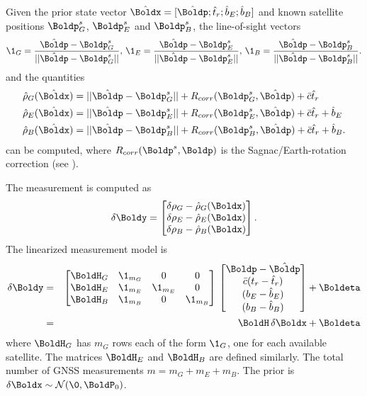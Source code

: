Given the prior state vector 
$\hat{\Boldx} = [\hat{\Boldp};\hat{t}_r;\hat{b}_{E};\hat{b}_{B}]$
and known satellite positions $\Boldp^s_G$, $\Boldp^s_E$ and $\Boldp^s_B$, the line-of-sight vectors 
\begin{equation}\label{eqn:ones}
\1_G = \frac{\hat{\Boldp}-\Boldp^s_G}{||\hat{\Boldp}-\Boldp^s_G||},\,
\1_E = \frac{\hat{\Boldp}-\Boldp^s_E}{||\hat{\Boldp}-\Boldp^s_E||},\,
\1_B = \frac{\hat{\Boldp}-\Boldp^s_B}{||\hat{\Boldp}-\Boldp^s_B||}.
\end{equation}
and the quantities
\begin{equation}\nonumber
	\begin{aligned}
		\hat{\rho}_G(\hat{\Boldx}) &= ||\hat{\Boldp}-\Boldp^s_G|| + R_{corr}(\Boldp^s_G,\hat{\Boldp})+ \bar{c}\hat{t}_r\\
		\hat{\rho}_E(\hat{\Boldx}) &= ||\hat{\Boldp}-\Boldp^s_E|| + R_{corr}(\Boldp^s_E,\hat{\Boldp})+ \bar{c} \hat{t}_r+\hat{b}_{E}\\
		\hat{\rho}_B(\hat{\Boldx}) &= ||\hat{\Boldp}-\Boldp^s_B|| + R_{corr}(\Boldp^s_B,\hat{\Boldp})+ \bar{c} \hat{t}_r+\hat{b}_{B}.
	\end{aligned}
\end{equation}
can be computed, where $R_{corr}(\Boldp^s,\Boldp)$ is the Sagnac/Earth-rotation correction (see \cite{HuFarrell2019}).

The measurement is computed as
$$\delta \Boldy =\begin{bmatrix}
\delta\rho_{G}-\hat{\rho}_G(\Boldx)\\
\delta\rho_{E}- \hat{\rho}_E(\Boldx)\\
\delta\rho_{B}-\hat{\rho}_B(\Boldx) \end{bmatrix}.$$
The linearized measurement model is
\begin{eqnarray}
	\delta \Boldy
	&=&  
	\begin{bmatrix}
		\BoldH_G & \1_{m_G} & 	0	&	0 \\ 
		\BoldH_E & \1_{m_E} & \1_{m_E} &  0 \\
		\BoldH_B & \1_{m_B} & 0		&  \1_{m_B}
	\end{bmatrix}\,
	\begin{bmatrix}
		\Boldp -\hat{\Boldp} \\ 
		\bar{c} (t_r- \hat{t}_r)\\ 
		(b_{E}-\hat{b}_{E}) \\ 
		(b_{B}-\hat{b}_{B})
		\end{bmatrix}	+\Boldeta \nonumber\\
	&=& 
	\BoldH\, \delta{\Boldx} + \Boldeta \label{eqn:GNSS model}
\end{eqnarray}
where $\BoldH_G$ has $m_G$ rows each  of the form $\1_G$, one for each available satellite.
The matrices $\BoldH_E$ and $\BoldH_B$ are defined similarly.
The total number of GNSS measurements $m=m_G+m_E+m_B$.
The prior is $\delta{\Boldx}\sim \mathcal{N}(\0,\BoldP_0)$.

\black 